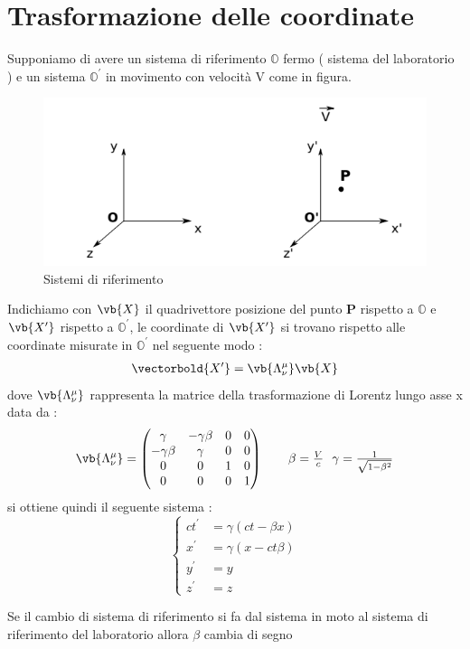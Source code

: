 \documentclass[a4paper, 12pt, twoside]{report}
\begin{document}
\section{Trasformazione delle coordinate}
Supponiamo di avere un sistema di riferimento $\mathbb O$ fermo ( sistema del laboratorio ) e un sistema $\mathbb O^{'} $ in movimento 
con velocità V come in figura.\\

\begin{figure}[!h]
        \centering 
        \includegraphics[scale=0.8]{SistemaRiferimento}
        \caption{Sistemi di riferimento}
\end{figure}
Indichiamo con $\vb{X}$ il quadrivettore posizione del punto \textbf{P} rispetto a $\mathbb O$ e $\vb{X^\prime}$ rispetto a $\mathbb O^\prime$, le coordinate di 
$\vb{X^\prime}$ si trovano rispetto alle coordinate misurate in $\mathbb O^\prime$ nel seguente modo : 
\begin{align*}
        \vectorbold{X^\prime} = \vb{\Lambda^{\mu}_{\nu}} \vb{X} 
\end{align*} 
dove $\vb{\Lambda^{\mu}_{\nu}}$ rappresenta la matrice della trasformazione di Lorentz lungo asse x data da : 
\begin{align*}
        \vb{\Lambda^{\mu}_{\nu}} = \begin{pmatrix} \gamma & -\gamma\beta & 0 & 0 \\ -\gamma\beta & \gamma & 0 & 0 \\ 0 & 0 & 1 & 0 \\ 0 & 0 & 0 & 1 \end{pmatrix} \tag*{$\beta = \frac{V}{c}$ \ $\gamma = \frac{1}{\sqrt{1-\beta^2}}$}
\end{align*}
si ottiene quindi il seguente sistema : 
\begin{equation*}
\left\{ \begin{aligned}
        ct^{\prime}&=\gamma(ct - \beta x) \\
        x^{\prime}&= \gamma( x - ct\beta ) \\
        y^{\prime}&= y \\
        z^{\prime} &= z
  \end{aligned}
  \right.
\end{equation*}
\begin{tcolorbox}[colback=red!5!white,colframe=red!50!black,title=ATTENZIONE !]
Se il cambio di sistema di riferimento si fa dal sistema in moto al sistema di riferimento del laboratorio allora $\beta$ cambia di segno 
\end{tcolorbox}
\newpage
\end{document}
